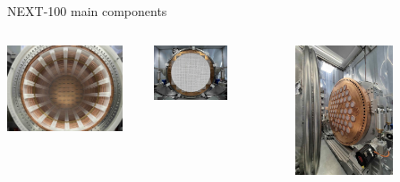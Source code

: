 \documentclass [aspectratio=169]{beamer}
\begin{document}
\begin{frame}{NEXT-100 main components}
\begin{columns}

\includegraphics[width=0.90\textwidth]{n100-tpc.jpeg}

\vspace*{5mm}


\includegraphics[width=0.60\textwidth]{n100-tp.jpeg}

\includegraphics[width=0.60\textwidth]{n100-pmt.jpeg}

\end{columns}
\end{frame}
\end{document}
